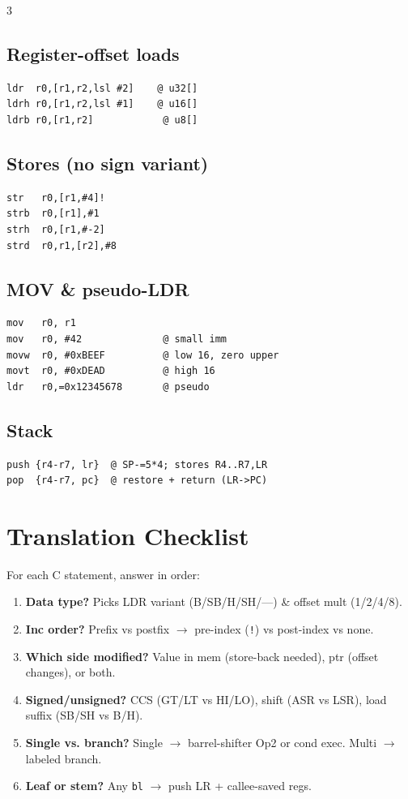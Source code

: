 \documentclass[8pt,landscape]{extarticle}
\newcommand{\asm}[1]{\texttt{\scriptsize #1}}
\begin{document}
\begin{multicols*}{3}
\subsection{Register-offset loads}
\begin{lstlisting}
ldr  r0,[r1,r2,lsl #2]    @ u32[]
ldrh r0,[r1,r2,lsl #1]    @ u16[]
ldrb r0,[r1,r2]            @ u8[]
\end{lstlisting}

\subsection{Stores (no sign variant)}
\begin{lstlisting}
str   r0,[r1,#4]!
strb  r0,[r1],#1
strh  r0,[r1,#-2]
strd  r0,r1,[r2],#8
\end{lstlisting}

\subsection{MOV \& pseudo-LDR}
\begin{lstlisting}
mov   r0, r1
mov   r0, #42              @ small imm
movw  r0, #0xBEEF          @ low 16, zero upper
movt  r0, #0xDEAD          @ high 16
ldr   r0,=0x12345678       @ pseudo
\end{lstlisting}

\subsection{Stack}
\begin{lstlisting}
push {r4-r7, lr}  @ SP-=5*4; stores R4..R7,LR
pop  {r4-r7, pc}  @ restore + return (LR->PC)
\end{lstlisting}

\section{Translation Checklist}
For each C statement, answer in order:
\begin{enumerate}
\item \textbf{Data type?} Picks LDR variant (B/SB/H/SH/---) \& offset mult (1/2/4/8).
\item \textbf{Inc order?} Prefix vs postfix $\to$ pre-index (\texttt{!}) vs post-index vs none.
\item \textbf{Which side modified?} Value in mem (store-back needed), ptr (offset changes), or both.
\item \textbf{Signed/unsigned?} CCS (GT/LT vs HI/LO), shift (ASR vs LSR), load suffix (SB/SH vs B/H).
\item \textbf{Single vs. branch?} Single $\to$ barrel-shifter Op2 or cond exec. Multi $\to$ labeled branch.
\item \textbf{Leaf or stem?} Any \asm{bl} $\to$ push LR + callee-saved regs.
\end{enumerate}

\end{multicols*}
\end{document}
